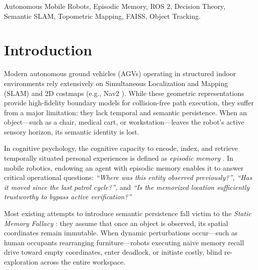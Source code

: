 \documentclass[conference]{IEEEtran}
\begin{document}
\begin{IEEEkeywords}
Autonomous Mobile Robots, Episodic Memory, ROS 2, Decision Theory, Semantic SLAM, Topometric Mapping, FAISS, Object Tracking.
\end{IEEEkeywords}

\section{Introduction}
Modern autonomous ground vehicles (AGVs) operating in structured indoor environments rely extensively on Simultaneous Localization and Mapping (SLAM) and 2D costmaps (e.g., Nav2 \cite{macenski2020marathon}). While these geometric representations provide high-fidelity boundary models for collision-free path execution, they suffer from a major limitation: they lack temporal and semantic persistence. When an object—such as a chair, medical cart, or workstation—leaves the robot's active sensory horizon, its semantic identity is lost. 

In cognitive psychology, the cognitive capacity to encode, index, and retrieve temporally situated personal experiences is defined as \textit{episodic memory} \cite{tulving1983elements}. In mobile robotics, endowing an agent with episodic memory enables it to answer critical operational questions: \textit{``Where was this entity observed previously?'', ``Has it moved since the last patrol cycle?'',} and \textit{``Is the memorized location sufficiently trustworthy to bypass active verification?''}

Most existing attempts to introduce semantic persistence fall victim to the \textit{Static Memory Fallacy} \cite{rosman2014decision}: they assume that once an object is observed, its spatial coordinates remain immutable. When dynamic perturbations occur—such as human occupants rearranging furniture—robots executing naive memory recall drive toward empty coordinates, enter deadlock, or initiate costly, blind re-exploration across the entire workspace.
\end{document}

